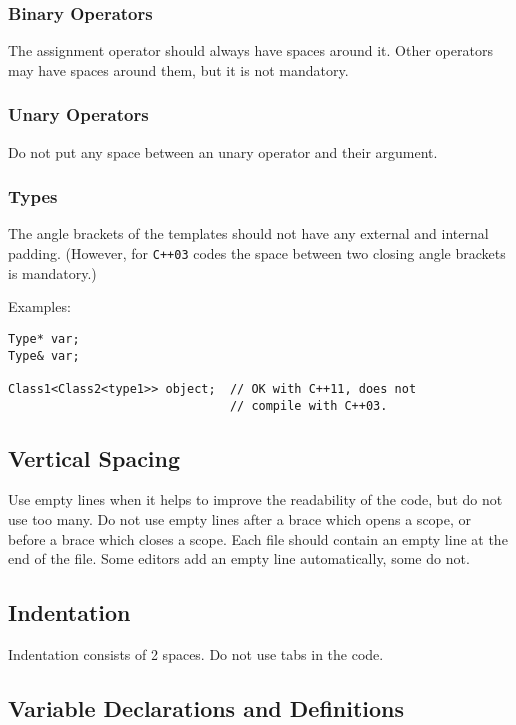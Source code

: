 \documentclass[a4paper]{article}
\begin{document}
\subsubsection{Binary Operators}

The assignment operator should always have spaces around it.
Other operators may have spaces around them, but it is not mandatory.

\subsubsection{Unary Operators}

Do not put any space between an unary operator and their argument.

\subsubsection{Types}

The angle brackets of the templates should not have any external and internal padding.
(However, for \texttt{C++03} codes the space between two closing angle brackets is mandatory.)

Examples:
\begin{lstlisting}
Type* var;
Type& var;

Class1<Class2<type1>> object;  // OK with C++11, does not
                               // compile with C++03.
\end{lstlisting}

\subsection{Vertical Spacing}

Use empty lines when it helps to improve the readability of the code, but do not use too many.
Do not use empty lines after a brace which opens a scope,
or before a brace which closes a scope.
Each file should contain an empty line at the end of the file.
Some editors add an empty line automatically, some do not.

\subsection{Indentation}

Indentation consists of 2 spaces.
Do not use tabs in the code.

\subsection{Variable Declarations and Definitions}
\end{document}
